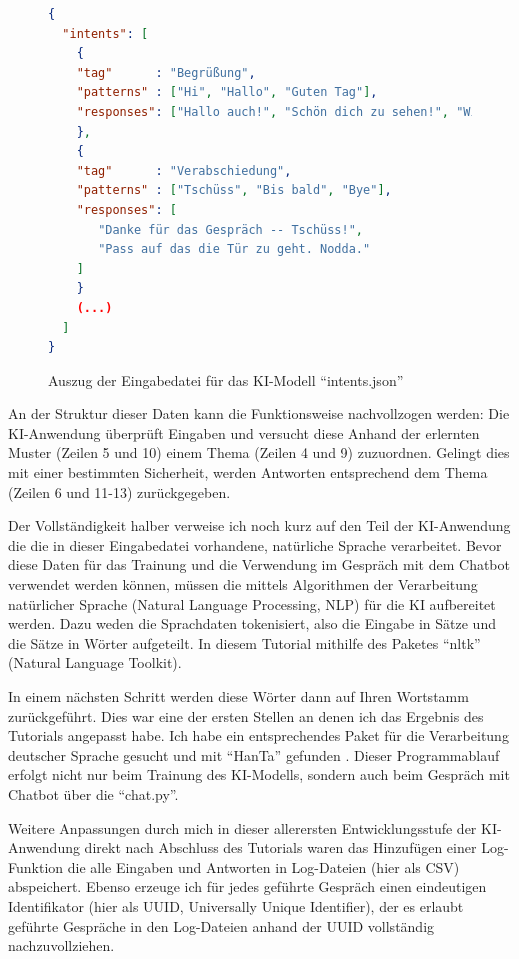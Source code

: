 \documentclass[12pt,oneside,titlepage,listof=totoc,bibliography=totoc]{scrartcl}
\begin{document}
\begin{figure}[H] \caption{Auszug der Eingabedatei für das KI-Modell \enquote{intents.json}}
\label{fig:code-intents.json} \begin{lstlisting}[language=json]
{
  "intents": [
    {
    "tag"      : "Begrüßung",
    "patterns" : ["Hi", "Hallo", "Guten Tag"],
    "responses": ["Hallo auch!", "Schön dich zu sehen!", "Willkommen!"]
    },
    {
    "tag"      : "Verabschiedung",
    "patterns" : ["Tschüss", "Bis bald", "Bye"],
    "responses": [
       "Danke für das Gespräch -- Tschüss!",
       "Pass auf das die Tür zu geht. Nodda."
    ]
    }
    (...)
  ]
}
\end{lstlisting} \end{figure}

An der Struktur dieser Daten kann die Funktionsweise nachvollzogen werden: Die KI-Anwendung überprüft Eingaben und versucht diese Anhand der erlernten Muster (Zeilen 5 und 10) einem Thema (Zeilen 4 und 9) zuzuordnen. Gelingt dies mit einer bestimmten Sicherheit, werden Antworten entsprechend dem Thema (Zeilen 6 und 11-13) zurückgegeben.

Der Vollständigkeit halber verweise ich noch kurz auf den Teil der KI-Anwendung die die in dieser Eingabedatei vorhandene, natürliche Sprache verarbeitet. Bevor diese Daten für das Trainung und die Verwendung im Gespräch mit dem Chatbot verwendet werden können, müssen die mittels Algorithmen der Verarbeitung natürlicher Sprache (Natural Language Processing, NLP) für die KI aufbereitet werden. Dazu weden die Sprachdaten tokenisiert, also die Eingabe in Sätze und die Sätze in Wörter aufgeteilt. In diesem Tutorial mithilfe des Paketes \enquote{nltk} (Natural Language Toolkit).

In einem nächsten Schritt werden diese Wörter dann auf Ihren Wortstamm zurückgeführt. Dies war eine der ersten Stellen an denen ich das Ergebnis des Tutorials angepasst habe. Ich habe ein entsprechendes Paket für die Verarbeitung deutscher Sprache gesucht und mit \enquote{HanTa} gefunden \parencite[]{57-wartena2019probabilistic}. Dieser Programmablauf erfolgt nicht nur beim Trainung des KI-Modells, sondern auch beim Gespräch mit Chatbot über die \enquote{chat.py}.

Weitere Anpassungen durch mich in dieser allerersten Entwicklungsstufe der KI-Anwendung direkt nach Abschluss des Tutorials waren das Hinzufügen einer Log-Funktion die alle Eingaben und Antworten in Log-Dateien (hier als CSV) abspeichert. Ebenso erzeuge ich für jedes geführte Gespräch einen eindeutigen Identifikator (hier als UUID, Universally Unique Identifier), der es erlaubt geführte Gespräche in den Log-Dateien anhand der UUID vollständig nachzuvollziehen. 
\end{document}
